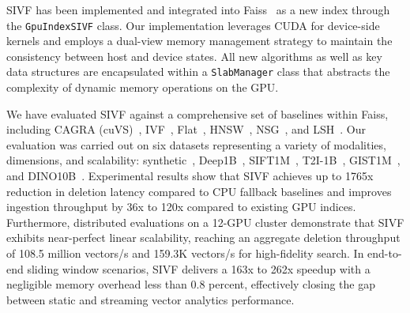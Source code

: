 \documentclass[sigconf,nonacm]{acmart}
\theoremstyle{plain}
\theoremstyle{definition}
\theoremstyle{remark}
\begin{document}
SIVF has been implemented and integrated into Faiss~\cite{douze2024faiss} as a new index through the \texttt{GpuIndexSIVF} class. Our implementation leverages CUDA for device-side kernels and employs a dual-view memory management strategy to maintain the consistency between host and device states. All new algorithms as well as key data structures are encapsulated within a \texttt{SlabManager} class that abstracts the complexity of dynamic memory operations on the GPU. 

We have evaluated SIVF against a comprehensive set of baselines within Faiss, including CAGRA (cuVS)~\cite{10597683}, IVF~\cite{johnson2019billion}, Flat~\cite{douze2024faiss}, HNSW~\cite{malkov2018efficient}, NSG~\cite{10.14778/3303753.3303754}, and LSH~\cite{10.1145/997817.997857}. Our evaluation was carried out on six datasets representing a variety of modalities, dimensions, and scalability: synthetic~\cite{douze2024faiss}, Deep1B~\cite{babenko2016efficient}, SIFT1M~\cite{jegou2011product}, T2I-1B~\cite{simhadri2025results}, GIST1M~\cite{jegou2011product}, and DINO10B~\cite{9709990}. Experimental results show that SIVF achieves up to 1765x reduction in deletion latency compared to CPU fallback baselines and improves ingestion throughput by 36x to 120x compared to existing GPU indices. Furthermore, distributed evaluations on a 12-GPU cluster demonstrate that SIVF exhibits near-perfect linear scalability, reaching an aggregate deletion throughput of 108.5 million vectors/s and 159.3K vectors/s for high-fidelity search. In end-to-end sliding window scenarios, SIVF delivers a 163x to 262x speedup with a negligible memory overhead less than 0.8 percent, effectively closing the gap between static and streaming vector analytics performance.
\end{document}
